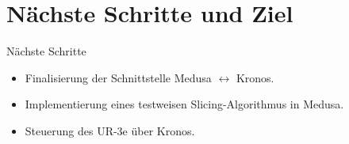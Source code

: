 \section{Nächste Schritte und Ziel}

\begin{frame}{Nächste Schritte}
    \begin{itemize}
        \item Finalisierung der Schnittstelle Medusa $\leftrightarrow$ Kronos.
        \vspace{0.2cm}
        \item Implementierung eines testweisen Slicing-Algorithmus in Medusa.
        \vspace{0.2cm}
        \item Steuerung des UR-3e über Kronos.
    \end{itemize}
\end{frame}
